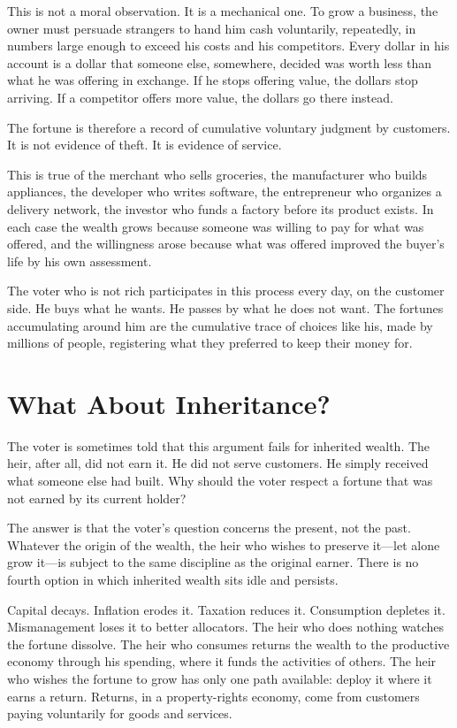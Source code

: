 \documentclass[11pt]{article}
\begin{document}
This is not a moral observation. It is a mechanical one. To grow a business, the owner must persuade strangers to hand him cash voluntarily, repeatedly, in numbers large enough to exceed his costs and his competitors. Every dollar in his account is a dollar that someone else, somewhere, decided was worth less than what he was offering in exchange. If he stops offering value, the dollars stop arriving. If a competitor offers more value, the dollars go there instead.

The fortune is therefore a record of cumulative voluntary judgment by customers. It is not evidence of theft. It is evidence of service.

This is true of the merchant who sells groceries, the manufacturer who builds appliances, the developer who writes software, the entrepreneur who organizes a delivery network, the investor who funds a factory before its product exists. In each case the wealth grows because someone was willing to pay for what was offered, and the willingness arose because what was offered improved the buyer's life by his own assessment.

The voter who is not rich participates in this process every day, on the customer side. He buys what he wants. He passes by what he does not want. The fortunes accumulating around him are the cumulative trace of choices like his, made by millions of people, registering what they preferred to keep their money for.

\section{What About Inheritance?}

The voter is sometimes told that this argument fails for inherited wealth. The heir, after all, did not earn it. He did not serve customers. He simply received what someone else had built. Why should the voter respect a fortune that was not earned by its current holder?

The answer is that the voter's question concerns the present, not the past. Whatever the origin of the wealth, the heir who wishes to preserve it---let alone grow it---is subject to the same discipline as the original earner. There is no fourth option in which inherited wealth sits idle and persists.

Capital decays. Inflation erodes it. Taxation reduces it. Consumption depletes it. Mismanagement loses it to better allocators. The heir who does nothing watches the fortune dissolve. The heir who consumes returns the wealth to the productive economy through his spending, where it funds the activities of others. The heir who wishes the fortune to grow has only one path available: deploy it where it earns a return. Returns, in a property-rights economy, come from customers paying voluntarily for goods and services.
\end{document}
